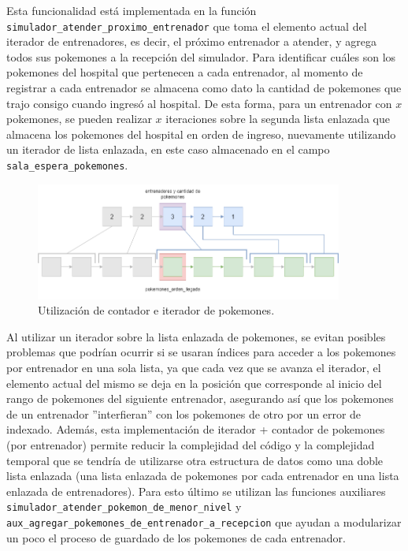 \documentclass[titlepage,a4paper]{article}
\begin{document}
Esta funcionalidad está implementada en la función \lstinline{simulador_atender_proximo_entrenador} que toma el elemento actual del iterador
de entrenadores, es decir, el próximo entrenador a atender, y agrega todos sus
pokemones a la recepción del simulador. Para identificar cuáles son los
pokemones del hospital que pertenecen a cada entrenador, al momento de registrar
a cada entrenador se almacena como dato la cantidad de pokemones que trajo
consigo cuando ingresó al hospital. De esta forma, para un entrenador con $x$
pokemones, se pueden realizar $x$ iteraciones sobre la segunda lista enlazada
que almacena los pokemones del hospital en orden de ingreso, nuevamente
utilizando un iterador de lista enlazada, en este caso almacenado en el
campo \lstinline{sala_espera_pokemones}. 

\begin{figure}[H]
\centering
\includegraphics[width=0.9\textwidth]{img/3_pokemones_de_entrenador.png}
\caption{\label{fig:seq03}Utilización de contador e iterador de pokemones.}
\end{figure}

Al utilizar un iterador sobre la lista
enlazada de pokemones, se evitan posibles problemas que podrían ocurrir si se
usaran índices para acceder a los pokemones por entrenador en una sola lista, ya
que cada vez que se avanza el iterador, el elemento actual del mismo se deja en
la posición que corresponde al inicio del rango de pokemones del siguiente
entrenador, asegurando así que los pokemones de un entrenador ''interfieran''
con los pokemones de otro por un error de indexado. Además, esta implementación
de iterador + contador de pokemones (por entrenador) permite reducir la
complejidad del código y la complejidad temporal que se tendría de utilizarse 
otra estructura de datos como una doble lista enlazada (una lista enlazada de
pokemones por cada entrenador en una lista enlazada de entrenadores). Para esto
último se utilizan las funciones auxiliares
\lstinline{simulador_atender_pokemon_de_menor_nivel} y
\lstinline{aux_agregar_pokemones_de_entrenador_a_recepcion} que ayudan a
modularizar	un poco el proceso de guardado de los pokemones de cada entrenador.
\end{document}
